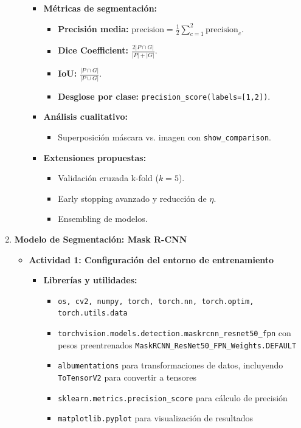 \begin{enumerate}
\begin{itemize}
\begin{itemize}
    \item \textbf{Métricas de segmentación:}
      \begin{itemize}
        \item \textbf{Precisión media:} \(\text{precision} = \frac{1}{2}\sum_{c=1}^2 \text{precision}_c\).
        \item \textbf{Dice Coefficient:} \(\frac{2|P\cap G|}{|P|+|G|}\).
        \item \textbf{IoU:} \(\frac{|P\cap G|}{|P\cup G|}\).
        \item \textbf{Desglose por clase:} \texttt{precision\_score(labels=[1,2])}.
      \end{itemize}
  
    \item \textbf{Análisis cualitativo:}
      \begin{itemize}
        \item Superposición máscara vs. imagen con \texttt{show\_comparison}.
   \end{itemize}
  
    \item \textbf{Extensiones propuestas:}
      \begin{itemize}
        \item Validación cruzada k-fold (\(k=5\)).
        \item Early stopping avanzado y reducción de \(\eta\).
        \item Ensembling de modelos.
      \end{itemize}
  \end{itemize}
  

  \end{itemize}

\item \textbf{Modelo de Segmentación: Mask R-CNN}
  \begin{itemize}
    \item \textbf{Actividad 1: Configuración del entorno de entrenamiento}
    \begin{itemize}
      \item \textbf{Librerías y utilidades:}
      \begin{itemize}
        \item \texttt{os, cv2, numpy, torch, torch.nn, torch.optim, torch.utils.data}
        \item \texttt{torchvision.models.detection.maskrcnn\_resnet50\_fpn} con pesos preentrenados \texttt{MaskRCNN\_ResNet50\_FPN\_Weights.DEFAULT}
        \item \texttt{albumentations} para transformaciones de datos, incluyendo \texttt{ToTensorV2} para convertir a tensores
        \item \texttt{sklearn.metrics.precision\_score} para cálculo de precisión
        \item \texttt{matplotlib.pyplot} para visualización de resultados
      \end{itemize}
  

\end{itemize}
\end{itemize}
\end{enumerate}
